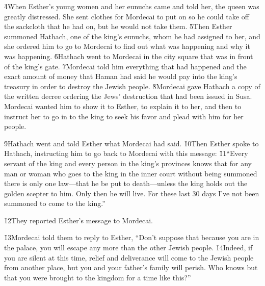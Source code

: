 \v{4}When Esther's young women and her eunuchs came and told her, the queen was greatly distressed. She sent clothes for Mordecai to put on so he could take off the sackcloth that he had on, but he would not take them. \v{5}Then Esther summoned Hathach, one of the king's eunuchs, whom he had assigned to her, and she ordered him to go to Mordecai to find out what was happening and why it was happening. \v{6}Hathach went to Mordecai in the city square that was in front of the king's gate. \v{7}Mordecai told him everything that had happened and the exact amount of money that Haman had said he would pay into the king's treasury in order to destroy the Jewish people. \v{8}Mordecai gave Hathach a copy of the written decree ordering the Jews' destruction that had been issued in Susa. Mordecai wanted him to show it to Esther, to explain it to her, and then to instruct her to go in to the king to seek his favor and plead with him for her people.

\v{9}Hathach went and told Esther what Mordecai had said. \v{10}Then Esther spoke to Hathach, instructing him to go back to Mordecai with this message: \v{11}``Every servant of the king and every person in the king's provinces knows that for any man or woman who goes to the king in the inner court without being summoned there is only one law---that he be put to death---unless the king holds out the golden scepter to him. Only then he will live. For these last 30 days I've not been summoned to come to the king.''

\v{12}They reported Esther's message to Mordecai.

\v{13}Mordecai told them to reply to Esther, ``Don't suppose that because you are in the palace, you will escape any more than the other Jewish people. \v{14}Indeed, if you are silent at this time, relief and deliverance will come to the Jewish people from another place, but you and your father's family will perish. Who knows but that you were brought to the kingdom for a time like this?''

